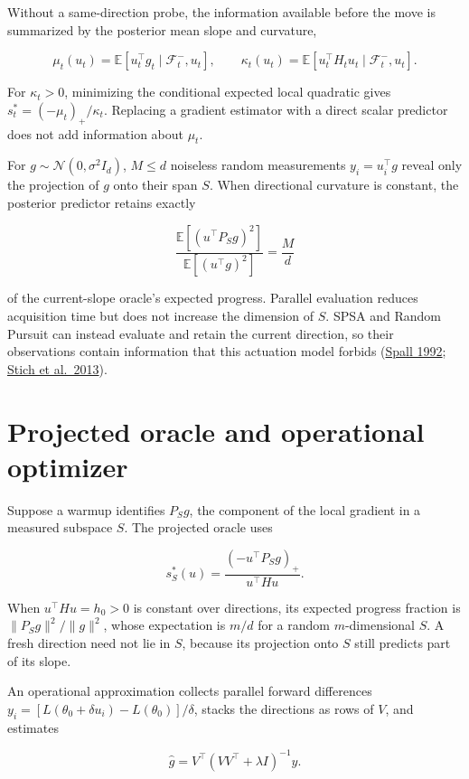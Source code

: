 \documentclass[11pt]{article}
\begin{document}
Without a same-direction probe, the information available before the move is summarized by the posterior mean slope and curvature,

\[
\mu_t(u_t)=\mathbb E[u_t^\top g_t\mid\mathcal F_t^-,u_t],
\qquad
\kappa_t(u_t)=\mathbb E[u_t^\top H_tu_t\mid\mathcal F_t^-,u_t].
\]

For \(\kappa_t>0\), minimizing the conditional expected local quadratic gives \(s_t^*=(-\mu_t)_+/\kappa_t\). Replacing a gradient estimator with a direct scalar predictor does not add information about \(\mu_t\).

For \(g\sim\mathcal N(0,\sigma^2I_d)\), \(M\leq d\) noiseless random measurements \(y_i=u_i^\top g\) reveal only the projection of \(g\) onto their span \(S\). When directional curvature is constant, the posterior predictor retains exactly

\[
\frac{\mathbb E[(u^\top P_Sg)^2]}{\mathbb E[(u^\top g)^2]}
=\frac{M}{d}
\]

of the current-slope oracle's expected progress. Parallel evaluation reduces acquisition time but does not increase the dimension of \(S\). SPSA and Random Pursuit can instead evaluate and retain the current direction, so their observations contain information that this actuation model forbids (\href{https://doi.org/10.1109/9.119632}{Spall 1992}; \href{https://doi.org/10.1137/110853613}{Stich et al.~2013}).

\section{Projected oracle and operational optimizer}\label{projected-and-operational}

Suppose a warmup identifies \(P_Sg\), the component of the local gradient in a measured subspace \(S\). The projected oracle uses

\[
s_S^*(u)=\frac{(-u^\top P_Sg)_+}{u^\top Hu}.
\]

When \(u^\top Hu=h_0>0\) is constant over directions, its expected progress fraction is \(\lVert P_Sg\rVert^2/\lVert g\rVert^2\), whose expectation is \(m/d\) for a random \(m\)-dimensional \(S\). A fresh direction need not lie in \(S\), because its projection onto \(S\) still predicts part of its slope.

An operational approximation collects parallel forward differences \(y_i=[L(\theta_0+\delta u_i)-L(\theta_0)]/\delta\), stacks the directions as rows of \(V\), and estimates

\[
\widehat g=V^\top(VV^\top+\lambda I)^{-1}y.
\]
\end{document}
